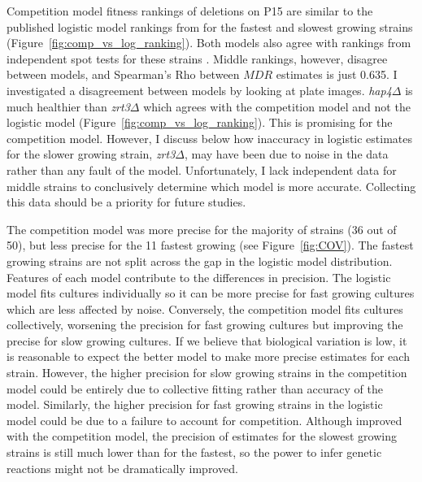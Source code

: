 Competition model fitness rankings of deletions on P15 are similar to
the published logistic model rankings from \citet{Addinall2011} for
the fastest and slowest growing strains
(Figure~\ref{fig:comp_vs_log_ranking}). Both models also agree with
rankings from independent spot tests for these strains
\citep{maringele2002exo1,zubko2004exo1,Holstein20141259,foster2006mrx}.
Middle rankings, however, disagree between models, and Spearman's Rho
between \(MDR\) estimates is just 0.635. I investigated a disagreement
between models by looking at plate images. \textit{hap4\(\Delta\)} is
much healthier than \textit{zrt3\(\Delta\)} which agrees with the
competition model and not the logistic model
(Figure~\ref{fig:comp_vs_log_ranking}). This is promising for the
competition model. However, I discuss below how inaccuracy in logistic
estimates for the slower growing strain, \textit{zrt3\(\Delta\)}, may
have been due to noise in the data rather than any fault of the
model. Unfortunately, I lack independent data for middle strains to
conclusively determine which model is more accurate. Collecting this
data should be a priority for future studies.

The competition model was more precise for the majority of strains (36
out of 50), but less precise for the 11 fastest growing (see
Figure~\ref{fig:COV}). The fastest growing strains are not split
across the gap in the logistic model distribution. Features of each
model contribute to the differences in precision. The logistic model
fits cultures individually so it can be more precise for fast growing
cultures which are less affected by noise. Conversely, the competition
model fits cultures collectively, worsening the precision for fast
growing cultures but improving the precise for slow growing cultures.
If we believe that biological variation is low, it is reasonable to
expect the better model to make more precise estimates for each
strain. However, the higher precision for slow growing strains in the
competition model could be entirely due to collective fitting rather
than accuracy of the model. Similarly, the higher precision for fast
growing strains in the logistic model could be due to a failure to
account for competition. Although improved with the competition model,
the precision of estimates for the slowest growing strains is still
much lower than for the fastest, so the power to infer genetic
reactions might not be dramatically improved.

